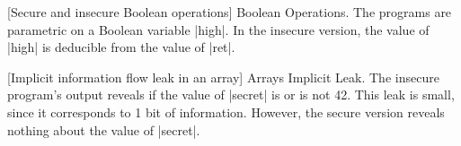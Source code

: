 \begin{center}
 \captionsetup{type=lstlisting}
 \begin{minipage}{.45\textwidth}
  \begin{center}\end{center}
 \end{minipage}\hfill%
 \begin{minipage}{.45\textwidth}
  \begin{center}\end{center}
 \end{minipage}
 [Secure and insecure Boolean operations]{
  Boolean Operations. The programs are parametric on a Boolean variable \pr|high|.
  In the insecure version, the value of \pr|high| is deducible from the value of \pr|ret|.
 }\label{lst:bool-ops}
\end{center}

\begin{center}
 \captionsetup{type=lstlisting}
 \begin{minipage}{.45\textwidth}
  \begin{center}\end{center}
 \end{minipage}\hfill%
 \begin{minipage}{.45\textwidth}
  \begin{center}\end{center}
 \end{minipage}
 [Implicit information flow leak in an array]{
  Arrays Implicit Leak. The insecure program's output reveals if the value of \pr|secret| is or is not 42.
  This leak is small, since it corresponds to 1 bit of information.
  However, the secure version reveals nothing about the value of \pr|secret|.}
 \label{lst:ni-arrays}
\end{center}

